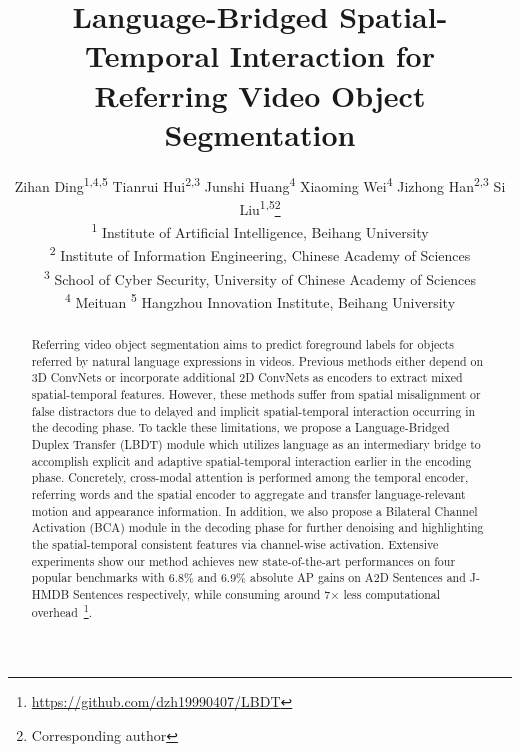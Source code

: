 \documentclass[10pt,twocolumn,letterpaper]{article}
\begin{document}
\title{Language-Bridged Spatial-Temporal Interaction for \\Referring Video Object Segmentation}

\author{Zihan Ding\textsuperscript{\rm 1,4,5} \quad Tianrui Hui\textsuperscript{\rm 2,3} \quad Junshi Huang\textsuperscript{\rm 4} \quad Xiaoming Wei\textsuperscript{\rm 4} \quad Jizhong Han\textsuperscript{\rm 2,3} \quad Si Liu\textsuperscript{\rm 1,5}\thanks{Corresponding author} \\
\textsuperscript{\rm 1} Institute of Artificial Intelligence, Beihang University\\
\textsuperscript{\rm 2} Institute of Information Engineering, Chinese Academy of Sciences\\
\textsuperscript{\rm 3} School of Cyber Security, University of Chinese Academy of Sciences\\
\textsuperscript{\rm 4} Meituan \quad \textsuperscript{\rm 5} Hangzhou Innovation Institute, Beihang University\\
}

\maketitle

\begin{abstract}

Referring video object segmentation aims to predict foreground labels for objects referred by natural language expressions in videos.
Previous methods either depend on 3D ConvNets or incorporate additional 2D ConvNets as encoders to extract mixed spatial-temporal features.
However, these methods suffer from spatial misalignment or false distractors due to delayed and implicit spatial-temporal interaction occurring in the decoding phase.
To tackle these limitations, we propose a Language-Bridged Duplex Transfer (LBDT) module which utilizes language as an intermediary bridge to accomplish explicit and adaptive spatial-temporal interaction earlier in the encoding phase.
Concretely, cross-modal attention is performed among the temporal encoder, referring words and the spatial encoder to aggregate and transfer language-relevant motion and appearance information.
In addition, we also propose a Bilateral Channel Activation (BCA) module in the decoding phase for further denoising and highlighting the spatial-temporal consistent features via channel-wise activation.
Extensive experiments show our method achieves new state-of-the-art performances on four popular benchmarks with 6.8\% and 6.9\% absolute AP gains on A2D Sentences and J-HMDB Sentences respectively, while consuming around 7$\times$ less computational overhead~\footnote{\url{https://github.com/dzh19990407/LBDT}}. 

\end{abstract}
\end{document}
